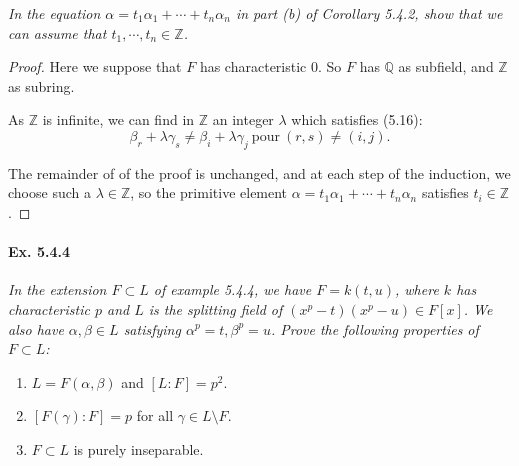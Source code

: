\documentclass[11pt,a4paper]{article}
\newcommand{\Q}{\mathbb{Q}}
\newcommand{\Z}{\mathbb{Z}}
\begin{document}
{\it In the equation $\alpha = t_1\alpha_1+\cdots+t_n \alpha_n$ in part (b) of Corollary 5.4.2, show that we can assume that $t_1,\cdots,t_n \in \Z$.
}

\begin{proof}
Here we suppose that $F$ has characteristic 0. So $F$ has $\Q$ as subfield, and $\Z$ as subring.

As $\Z$ is infinite, we can find in $\Z$ an integer $\lambda$ which satisfies (5.16):
$$\beta_r + \lambda \gamma_s \neq \beta_i + \lambda \gamma_j\ \mathrm{pour}\ (r,s) \neq(i,j).$$

The remainder of of the proof is unchanged, and at each step of the induction, we choose such a  $\lambda \in \Z$, so the primitive element $\alpha = t_1\alpha_1+\cdots+t_n\alpha_n$ satisfies $t_i \in \Z$.
\end{proof}

\paragraph{Ex. 5.4.4}

{\it In the extension $F \subset L$ of example 5.4.4, we have $F=k(t,u)$, where $k$ has characteristic $p$ and $L$ is the splitting field of $(x^p-t)(x^p-u) \in F[x]$. We also have $\alpha,\beta \in L$ satisfying $\alpha^p=t, \beta^p=u$. Prove the following properties of $F \subset L$:
\begin{enumerate}
\item[(a)] $L = F(\alpha,\beta)$ and $[L:F] = p^2$.
\item[(b)] $[F(\gamma):F] = p$ for all $\gamma \in L \setminus F$.
\item[(c)] $F \subset L$ is purely inseparable.
\end{enumerate}
}
\end{document}
